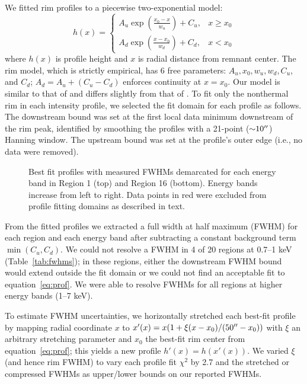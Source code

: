 \documentclass[iop, apj, numberedappendix, twocolappendix]{emulateapj}
\newcommand*{\abt}{\mathord{\sim}} %
\begin{document}
We fitted rim profiles to a piecewise two-exponential model:
\begin{equation} \label{eq:prof}
    h(x) =
    \begin{cases}
        A_u \exp \left(\frac{x_0 - x}{w_u}\right) + C_u, &x \geq x_0 \\
        A_d \exp \left(\frac{x - x_0}{w_d}\right) + C_d, &x < x_0
    \end{cases}
\end{equation}
where $h(x)$ is profile height and $x$ is radial distance from remnant center.
The rim model, which is strictly empirical, has 6 free parameters:
$A_u, x_0, w_u, w_d, C_u$, and $C_d$; $A_d = A_u + (C_u - C_d)$ enforces
continuity at $x=x_0$. Our model is similar to that of \citet{bamba2003,
bamba2005-hist} and differs slightly from that of .
To fit only the nonthermal rim in each intensity profile, we selected the fit
domain for each profile as follows.  The downstream bound was set at the first
local data minimum downstream of the rim peak, identified by smoothing the
profiles with a 21-point ($\abt 10\arcsec$) Hanning window.  The upstream bound
was set at the profile's outer edge (i.e., no data were removed).

\begin{figure*}[ht]
    \caption{Best fit profiles with measured FWHMs demarcated for each energy
        band in Region 1 (top) and Region 16 (bottom).  Energy bands increase
        from left to right.  Data points in red were excluded from profile
        fitting domains as described in text.}
    \label{fig:profiles}
\end{figure*}

From the fitted profiles we extracted a full width at half maximum (FWHM) for
each region and each energy band after subtracting a constant background term
$\min(C_u, C_d)$.  We could not resolve a FWHM in 4 of 20 regions at 0.7--1 keV
(Table~\ref{tab:fwhms}); in these regions, either the downstream FWHM bound
would extend outside the fit domain or we could not find an acceptable fit to
equation~\eqref{eq:prof}.  We were able to resolve FWHMs for all regions at
higher energy bands (1--7 keV).

To estimate FWHM uncertainties, we horizontally stretched each best-fit
profile by mapping radial coordinate $x$ to
$x'(x) = x (1 + \xi (x-x_0)/(50\mbox{$^{\prime\prime}$}-x_0))$ with $\xi$ an arbitrary stretching
parameter and $x_0$ the best-fit rim center from equation~\eqref{eq:prof};
this yields a new profile $h'(x) = h(x'(x))$.
We varied $\xi$ (and hence rim FWHM) to vary each profile fit $\chi^2$ by 2.7
and the stretched or compressed FWHMs as upper/lower bounds on our reported
FWHMs.
\end{document}
